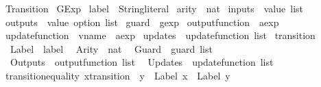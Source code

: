 %
\begin{isabellebody}%
%
%
\isadelimtheory
%
\endisadelimtheory
%
\isatagtheory
{}\isamarkupfalse%
\ Transition\isanewline
{}\ GExp\isanewline
{}%
\endisatagtheory
{\isafoldtheory}%
%
\isadelimtheory
\isanewline
%
\endisadelimtheory
\isanewline
{}\isamarkupfalse%
\ label\ {\isacharequal}\ String{\isachardot}literal\isanewline
{}\isamarkupfalse%
\ arity\ {\isacharequal}\ nat\isanewline
{}\isamarkupfalse%
\ inputs\ {\isacharequal}\ {\isachardoublequoteopen}value\ list{\isachardoublequoteclose}\isanewline
{}\isamarkupfalse%
\ outputs\ {\isacharequal}\ {\isachardoublequoteopen}value\ option\ list{\isachardoublequoteclose}\isanewline
{}\isamarkupfalse%
\ guard\ {\isacharequal}\ {\isachardoublequoteopen}gexp{\isachardoublequoteclose}\isanewline
{}\isamarkupfalse%
\ output{\isacharunderscore}function\ {\isacharequal}\ {\isachardoublequoteopen}aexp{\isachardoublequoteclose}\isanewline
{}\isamarkupfalse%
\ update{\isacharunderscore}function\ {\isacharequal}\ {\isachardoublequoteopen}{\isacharparenleft}vname\ {\isasymtimes}\ aexp{\isacharparenright}{\isachardoublequoteclose}\isanewline
{}\isamarkupfalse%
\ updates\ {\isacharequal}\ {\isachardoublequoteopen}update{\isacharunderscore}function\ list{\isachardoublequoteclose}\isanewline
\isanewline
{}\isamarkupfalse%
\ transition\ {\isacharequal}\isanewline
\ \ Label\ {\isacharcolon}{\isacharcolon}\ label\isanewline
\ \ Arity\ {\isacharcolon}{\isacharcolon}\ nat\isanewline
\ \ Guard\ {\isacharcolon}{\isacharcolon}\ {\isachardoublequoteopen}guard\ list{\isachardoublequoteclose}\isanewline
\ \ Outputs\ {\isacharcolon}{\isacharcolon}\ {\isachardoublequoteopen}output{\isacharunderscore}function\ list{\isachardoublequoteclose}\isanewline
\ \ Updates\ {\isacharcolon}{\isacharcolon}\ {\isachardoublequoteopen}update{\isacharunderscore}function\ list{\isachardoublequoteclose}\isanewline
\isanewline
{}\isamarkupfalse%
\ transition{\isacharunderscore}equality{\isacharcolon}\ {\isachardoublequoteopen}{\isacharparenleft}{\isacharparenleft}x{\isacharcolon}{\isacharcolon}transition{\isacharparenright}\ {\isacharequal}\ y{\isacharparenright}\ {\isacharequal}\ {\isacharparenleft}{\isacharparenleft}Label\ x{\isacharparenright}\ {\isacharequal}\ {\isacharparenleft}Label\ y{\isacharparenright}\ {\isasymand}\isanewline

\end{isabellebody}
